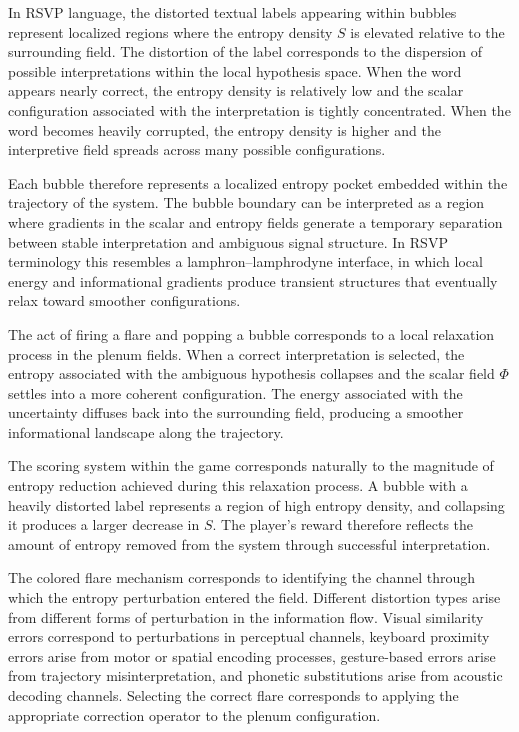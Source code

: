 \documentclass[11pt]{article}
\begin{document}
In RSVP language, the distorted textual labels appearing within bubbles represent localized regions where the entropy density $S$ is elevated relative to the surrounding field. The distortion of the label corresponds to the dispersion of possible interpretations within the local hypothesis space. When the word appears nearly correct, the entropy density is relatively low and the scalar configuration associated with the interpretation is tightly concentrated. When the word becomes heavily corrupted, the entropy density is higher and the interpretive field spreads across many possible configurations.

Each bubble therefore represents a localized entropy pocket embedded within the trajectory of the system. The bubble boundary can be interpreted as a region where gradients in the scalar and entropy fields generate a temporary separation between stable interpretation and ambiguous signal structure. In RSVP terminology this resembles a lamphron--lamphrodyne interface, in which local energy and informational gradients produce transient structures that eventually relax toward smoother configurations.

The act of firing a flare and popping a bubble corresponds to a local relaxation process in the plenum fields. When a correct interpretation is selected, the entropy associated with the ambiguous hypothesis collapses and the scalar field $\Phi$ settles into a more coherent configuration. The energy associated with the uncertainty diffuses back into the surrounding field, producing a smoother informational landscape along the trajectory.

The scoring system within the game corresponds naturally to the magnitude of entropy reduction achieved during this relaxation process. A bubble with a heavily distorted label represents a region of high entropy density, and collapsing it produces a larger decrease in $S$. The player's reward therefore reflects the amount of entropy removed from the system through successful interpretation.

The colored flare mechanism corresponds to identifying the channel through which the entropy perturbation entered the field. Different distortion types arise from different forms of perturbation in the information flow. Visual similarity errors correspond to perturbations in perceptual channels, keyboard proximity errors arise from motor or spatial encoding processes, gesture-based errors arise from trajectory misinterpretation, and phonetic substitutions arise from acoustic decoding channels. Selecting the correct flare corresponds to applying the appropriate correction operator to the plenum configuration.
\end{document}

